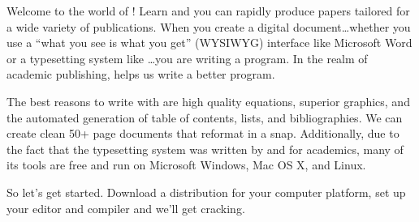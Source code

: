 \begin{preface}
Welcome to the world of \Latex! Learn \Latex and you can rapidly
produce papers tailored for a wide variety of publications.
When you create a digital
document\ldots whether you use a ``what you see is what you get''
(WYSIWYG) interface like Microsoft Word or a typesetting system like
\Latex\ldots you are writing a program.  In the realm of academic publishing,
\Latex helps us write a better program.   

The best reasons to write with \Latex are high quality equations,
superior graphics, and the automated generation of table of contents,
lists, and bibliographies.  We can create clean 50+ page documents
that reformat in a snap.  Additionally, due to the fact that the
\Latex typesetting system was written by and for academics, many
of its tools are free and run on Microsoft Windows, Mac OS X, and
Linux.

So let's get started.  Download a \Latex distribution for 
your computer platform, set up your editor and compiler and we'll get 
cracking.  
\end{preface}


